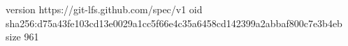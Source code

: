 version https://git-lfs.github.com/spec/v1
oid sha256:d75a43fe103cd13e0029a1cc5f66e4c35a6458cd142399a2abbaf800c7e3b4eb
size 961
